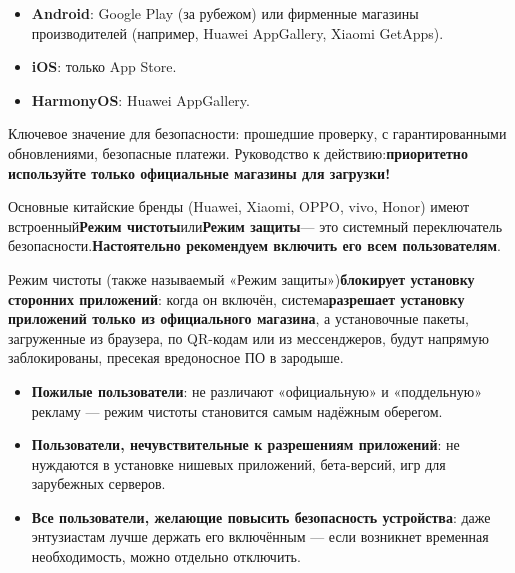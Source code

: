 


\begin{itemize}
  \item \textbf{Android}: Google Play (за рубежом) или фирменные магазины производителей (например, Huawei AppGallery, Xiaomi GetApps).
  \item \textbf{iOS}: только App Store.
  \item \textbf{HarmonyOS}: Huawei AppGallery.
\end{itemize}

Ключевое значение для безопасности: прошедшие проверку, с гарантированными обновлениями, безопасные платежи. Руководство к действию:\textbf{приоритетно используйте только официальные магазины для загрузки!}


Основные китайские бренды (Huawei, Xiaomi, OPPO, vivo, Honor) имеют встроенный\textbf{Режим чистоты}или\textbf{Режим защиты}— это системный переключатель безопасности.\textbf{Настоятельно рекомендуем включить его всем пользователям}.


Режим чистоты (также называемый «Режим защиты»)\textbf{блокирует установку сторонних приложений}: когда он включён, система\textbf{разрешает установку приложений только из официального магазина}, а установочные пакеты, загруженные из браузера, по QR-кодам или из мессенджеров, будут напрямую заблокированы, пресекая вредоносное ПО в зародыше.


\begin{itemize}
  \item \textbf{Пожилые пользователи}: не различают «официальную» и «поддельную» рекламу — режим чистоты становится самым надёжным оберегом.
  \item \textbf{Пользователи, нечувствительные к разрешениям приложений}: не нуждаются в установке нишевых приложений, бета-версий, игр для зарубежных серверов.
  \item \textbf{Все пользователи, желающие повысить безопасность устройства}: даже энтузиастам лучше держать его включённым — если возникнет временная необходимость, можно отдельно отключить.
\end{itemize}

